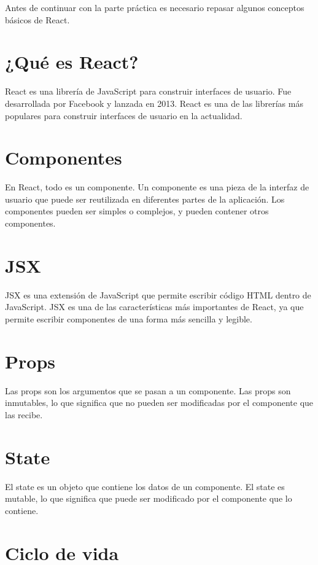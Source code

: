 \documentclass[
  a4paper,
  DIV=11,
  numbers=noendperiod,
  onepage,
  openany]{scrreprt}
\begin{document}
\begin{tcolorbox}
Antes de continuar con la parte práctica es necesario repasar algunos
conceptos básicos de React.

\section{¿Qué es React?}\label{quuxe9-es-react}

React es una librería de JavaScript para construir interfaces de
usuario. Fue desarrollada por Facebook y lanzada en 2013. React es una
de las librerías más populares para construir interfaces de usuario en
la actualidad.

\section{Componentes}\label{componentes}

En React, todo es un componente. Un componente es una pieza de la
interfaz de usuario que puede ser reutilizada en diferentes partes de la
aplicación. Los componentes pueden ser simples o complejos, y pueden
contener otros componentes.

\section{JSX}\label{jsx}

JSX es una extensión de JavaScript que permite escribir código HTML
dentro de JavaScript. JSX es una de las características más importantes
de React, ya que permite escribir componentes de una forma más sencilla
y legible.

\section{Props}\label{props}

Las props son los argumentos que se pasan a un componente. Las props son
inmutables, lo que significa que no pueden ser modificadas por el
componente que las recibe.

\section{State}\label{state}

El state es un objeto que contiene los datos de un componente. El state
es mutable, lo que significa que puede ser modificado por el componente
que lo contiene.

\section{Ciclo de vida}\label{ciclo-de-vida}


\end{tcolorbox}
\end{document}
